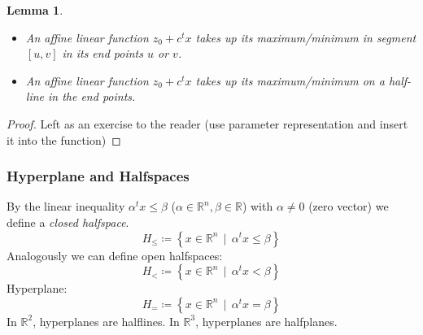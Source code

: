 \documentclass[a4paper]{article}
\newcounter{lecref}[subsection]
\numberwithin{lecref}{subsection}
\newtheorem{lemma}[lecref]{Lemma}
\newcommand{\SetDef}[2]{\left\{#1\,\mid\,#2\right\}}
\begin{document}
\begin{lemma}
	\label{lemma:1.1}
	\begin{itemize}
		\item An affine linear function $z_0 + c^t x$ takes up its maximum/minimum in segment $[u, v]$ in its end points $u$ or $v$.
		\item An affine linear function $z_0 + c^t x$ takes up its maximum/minimum on a half-line in the end points.
	\end{itemize}
\end{lemma}
\begin{proof}
	Left as an exercise to the reader (use parameter representation and insert it into the function)
\end{proof}

\subsubsection{Hyperplane and Halfspaces}

By the linear inequality $\alpha^t x \leq \beta$ ($\alpha \in \mathbb R^n, \beta \in \mathbb R$) with $\alpha \neq 0$ (zero vector) we define a \emph{closed halfspace}.
\[ H_{\leq} \coloneqq \SetDef{x \in \mathbb R^n}{\alpha^t x \leq \beta} \]
Analogously we can define open halfspaces:
\[ H_{<} \coloneqq \SetDef{x \in \mathbb R^n}{\alpha^t x < \beta} \]
Hyperplane:
\[ H_{=} \coloneqq \SetDef{x \in \mathbb R^n}{\alpha^t x = \beta} \]
In $\mathbb R^2$, hyperplanes are halflines.
In $\mathbb R^3$, hyperplanes are halfplanes.
\end{document}
